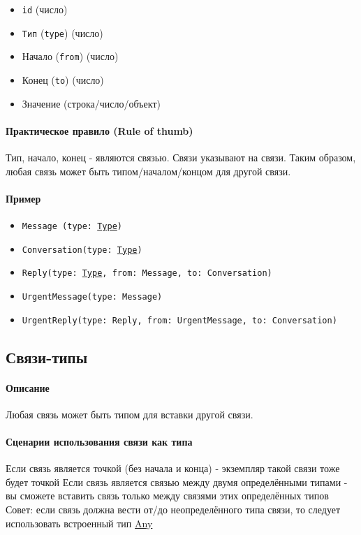 \documentclass{article}
\begin{document}
\begin{itemize}
  \item \texttt{id} (число)
  \item \texttt{Тип} (\texttt{type}) (число)
  \item Начало (\texttt{from}) (число)
  \item Конец (\texttt{to}) (число)
  \item Значение (строка/число/объект)
\end{itemize}

\paragraph{Практическое правило (Rule of thumb)}
Тип, начало, конец - являются связью. Связи указывают на связи. Таким образом,
любая связь может быть типом/началом/концом для другой связи.

\paragraph{Пример}

\begin{itemize}
  \item \texttt{Message (type: \hyperlink{type.Def}{Type})}
  \item \texttt{Conversation(type: \hyperlink{type.Def}{Type})}
  \item \texttt{Reply(type: \hyperlink{type.Def}{Type}, from: Message, to:
          Conversation)}
  \item \texttt{UrgentMessage(type: Message)}
  \item \texttt{UrgentReply(type: Reply, from: UrgentMessage, to:
          Conversation)}
\end{itemize}

\subsection{Связи-типы}
\paragraph{Описание}
Любая связь может быть типом для вставки другой связи.
\paragraph{Сценарии использования связи как типа}
Если связь является точкой (без начала и конца) - экземпляр такой связи тоже
будет точкой
Если связь является связью между двумя определёнными типами - вы сможете
вставить связь только между связями этих определённых типов
Совет: если связь должна вести от/до неопределённого типа связи, то следует
использовать встроенный тип \hyperlink{any.Def}{Any}
\end{document}
